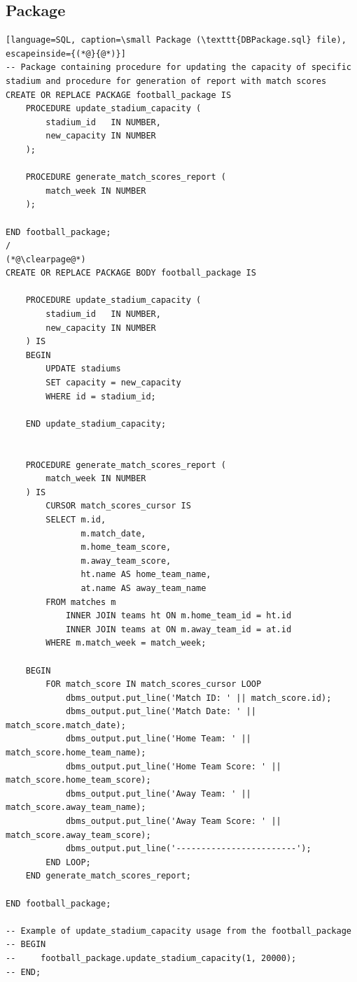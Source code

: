 \documentclass[11pt]{article}
\begin{document}
\subsection{Package}
\begin{lstlisting}[language=SQL, caption=\small Package (\texttt{DBPackage.sql} file), escapeinside={(*@}{@*)}]
-- Package containing procedure for updating the capacity of specific stadium and procedure for generation of report with match scores
CREATE OR REPLACE PACKAGE football_package IS
    PROCEDURE update_stadium_capacity (
        stadium_id   IN NUMBER,
        new_capacity IN NUMBER
    );

    PROCEDURE generate_match_scores_report (
        match_week IN NUMBER
    );

END football_package;
/
(*@\clearpage@*)
CREATE OR REPLACE PACKAGE BODY football_package IS

    PROCEDURE update_stadium_capacity (
        stadium_id   IN NUMBER,
        new_capacity IN NUMBER
    ) IS
    BEGIN
        UPDATE stadiums
        SET capacity = new_capacity
        WHERE id = stadium_id;

    END update_stadium_capacity;


    PROCEDURE generate_match_scores_report (
        match_week IN NUMBER
    ) IS
        CURSOR match_scores_cursor IS
        SELECT m.id,
               m.match_date,
               m.home_team_score,
               m.away_team_score,
               ht.name AS home_team_name,
               at.name AS away_team_name
        FROM matches m
            INNER JOIN teams ht ON m.home_team_id = ht.id
            INNER JOIN teams at ON m.away_team_id = at.id
        WHERE m.match_week = match_week;

    BEGIN
        FOR match_score IN match_scores_cursor LOOP
            dbms_output.put_line('Match ID: ' || match_score.id);
            dbms_output.put_line('Match Date: ' || match_score.match_date);
            dbms_output.put_line('Home Team: ' || match_score.home_team_name);
            dbms_output.put_line('Home Team Score: ' || match_score.home_team_score);
            dbms_output.put_line('Away Team: ' || match_score.away_team_name);
            dbms_output.put_line('Away Team Score: ' || match_score.away_team_score);
            dbms_output.put_line('------------------------');
        END LOOP;
    END generate_match_scores_report;

END football_package;

-- Example of update_stadium_capacity usage from the football_package
-- BEGIN
--     football_package.update_stadium_capacity(1, 20000);
-- END;


\end{lstlisting}
\end{document}
